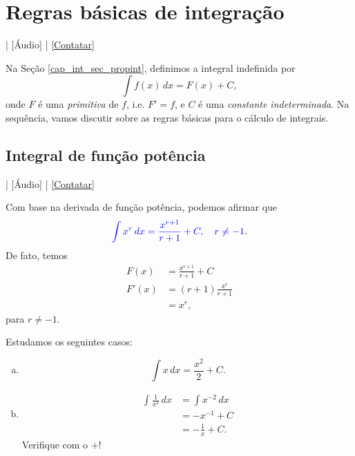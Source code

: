 \section{Regras básicas de integração}\label{cap_int_sec_regrasbasic}

\begin{flushright}
  [Vídeo] | [Áudio] | \href{https://phkonzen.github.io/notas/contato.html}{[Contatar]}
\end{flushright}

Na Seção \ref{cap_int_sec_propint}, definimos a integral indefinida por
\begin{equation}
  \int f(x)\,dx = F(x) + C,
\end{equation}
onde $F$ é uma \emph{primitiva} de $f$, i.e. $F' = f$, e $C$ é uma \emph{constante indeterminada}. Na sequência, vamos discutir sobre as regras básicas para o cálculo de integrais.

\subsection{Integral de função potência}

\begin{flushright}
  [Vídeo] | [Áudio] | \href{https://phkonzen.github.io/notas/contato.html}{[Contatar]}
\end{flushright}

Com base na derivada de função potência, podemos afirmar que
\begin{equation}\label{eq:int_fpot}
  {\color{blue}\int x^r\,dx = \frac{x^{r+1}}{r+1} + C,\quad r\neq -1}.
\end{equation}
De fato, temos
\begin{align}
  F(x) &= \frac{x^{r+1}}{r+1} + C \\
  F'(x) &= (r+1) \frac{x^r}{r+1} \\
  &= x^r,
\end{align}
para $r\neq -1$.

\begin{ex}
  Estudamos os seguintes casos:
  \begin{enumerate}[a)]
  \item
    \begin{equation}
      \int x\,dx = \frac{x^2}{2} + C.
    \end{equation}
  \item
    \begin{align}
      \int \frac{1}{x^2}\,dx &= \int x^{-2}\,dx \\
                             &= -x^{-1} + C \\
                             &= -\frac{1}{x}+C.
    \end{align}
    \ifispython
    Verifique com o {\python}+{\sympy}!
    \fi
  \end{enumerate}
\end{ex}

